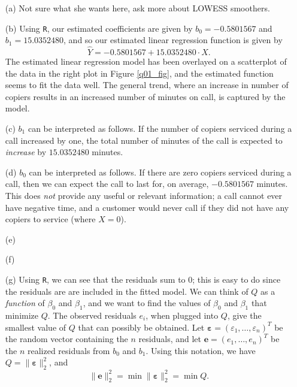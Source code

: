 \documentclass[10pt]{article}
\begin{document}
\begin{itemize}
    \item[(a)] Not sure what she wants here, ask more about LOWESS smoothers.
    \item[(b)] Using \texttt{R}, our estimated coefficients are given by \(b_0 = -0.5801567\)
    and \(b_1 = 15.0352480\), and so our estimated linear regression function is given by
    \[\hat{Y} = -0.5801567 + 15.0352480 \cdot X.\] The estimated linear regression model has been 
    overlayed on a scatterplot of the data in the right plot in Figure \ref{q01_fig}, and the 
    estimated function seems to fit the data well. The general trend, where an increase in number of 
    copiers results in an increased number of minutes on call, is captured by the model.
    \item[(c)] \(b_1\) can be interpreted as follows. If the number of copiers serviced during
    a call increased by one, the total number of minutes of the call is expected to \textit{increase} by 
    \(15.0352480\) minutes. 
    \item[(d)] \(b_0\) can be interpreted as follows. If there are zero copiers serviced during 
    a call, then we can expect the call to last for, on average, \(-0.5801567 \) minutes. This does \textit{not}
    provide any useful or relevant information; a call cannot ever have negative time, and a customer would never
    call if they did not have any copiers to service (where \(X = 0\)).
    \item[(e)] 
    \item[(f)] 
    \item[(g)] Using \texttt{R}, we can see that the residuals sum to 0; this is easy to do since the residuals are
    are included in the fitted model. We can think of \(Q\) as a \textit{function} 
    of \(\beta_0\) and \(\beta_1\), and we want to find the values of \(\beta_0\) and \(\beta_1\) that minimize \(Q\).
    The observed residuals \(e_i\), when plugged into \(Q\), give the smallest value of \(Q\) that can possibly be obtained. 
    Let \(\bm{\varepsilon} = (\varepsilon_1, \ldots, \varepsilon_n)^T\) be the random vector containing the \(n\) 
    residuals, and let \(\mathbf{e} = (e_1, \ldots, e_n)^T\) be the \(n\) realized residuals from \(b_0\)
    and \(b_1\). Using this 
    notation, we have \(Q = \| \bm{\varepsilon} \|_2^2\), and \[\| \mathbf{e}\|_2^2 = \min \|\bm{\varepsilon}\|_2^2 = \min Q.\]

\end{itemize}
\end{document}
